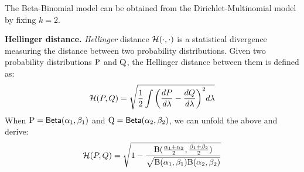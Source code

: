 \documentclass{article}
\begin{document}
%
The Beta-Binomial model can be obtained from the Dirichlet-Multinomial
model by fixing $k=2$. 

\noindent \textbf{Hellinger distance.}
\emph{Hellinger} distance $\mathcal{H}(\cdot,\cdot)$ is a statistical
divergence measuring the distance between two probability
distributions. Given two probability distributions $\textup{P}$ and $\textup{Q}$,
the Hellinger distance between them is defined as:
\[
\mathcal{H}(P,Q) =\sqrt{\frac{1}{2} \int \bigg(\frac{dP}{d \lambda} - \frac{dQ}{d \lambda}\bigg)^2 d \lambda}
\]
When $\textup{P}=\mathsf{Beta}(\alpha_1, \beta_1)$ and $\textup{Q}=\mathsf{Beta}(\alpha_2, \beta_2)$, we can unfold the above and derive: 
\[
 \mathcal{H}(P,Q) =  \sqrt{1 - \frac{\textup{B}(\frac{\alpha_1 + \alpha_2}{2}, \frac{\beta_1 + \beta_2}{2})}{\sqrt{\textup{B}(\alpha_1,\beta_1)\textup{B}(\alpha_2,\beta_2)}}}
\]
\end{document}
